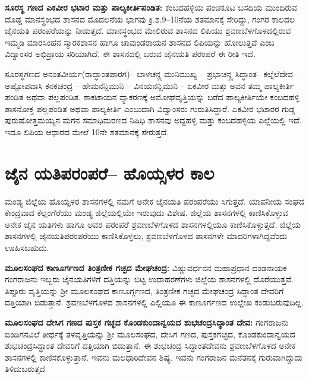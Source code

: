 \textbf{ಸೂರಸ್ಥ ಗಣದ ಎಕವೀರ ಭಟಾರ ಮತ್ತು ಪಾಲ್ಯಕೀರ್ತಿಪಂಡಿತ: } ಕಂಬದಹಳ್ಳಿಯ ಪಂಚಕೂಟ ಬಸದಿಯ ಮುಂದಿರುವ ದೊಡ್ಡ ಮಾನಸ್ಥಂಭದ ಶಾಸನದ ಮೊದಲನೆಯ ಭಾಗವು ಕ್ರಿ.ಶ.9–10ನೆಯ ಶತಮಾನಕ್ಕೆ ಸೇರಿದ್ದು, ಗಂಗರ ಕಾಲದಲ ಜೈನಯತಿ ಪರಂಪರೆಯನ್ನು ನೀಡುತ್ತದೆ. ಮಾನಸ್ಥಂಭದ ಮೇಲಿರುವ ಶಾಸನದ ಲಿಪಿಯು ಶ್ರವಣಬೆಳಗೊಳದಲ್ಲಿರುವ ಇಮ್ಮಡಿ ಮಾರಸಿಂಹನ ಸ್ಮಾರಕಶಾಸನ ಹಾಗೂ ಚಾವುಂಡರಾಯನ ಶಾಸನದ ಲಿಪಿಯನ್ನು ಹೋಲುತ್ತವೆ ಎಂಬ ವಿದ್ವಾಂಸರ ಅಭಿಪ್ರಾಯ ಸರಿಯಾಗಿದೆ. ಈ ಶಾಸನದಲ್ಲಿ ಬರುವ ಜೈನಯತಿ ಪರಂಪರೆ ಈ ರೀತಿ ಇದೆ.

ಸೂರಸ್ಥಗಣದ ಅನಂತವೀರ್ಯ(ರಾದ್ಧಾಂತಪಾರಗ)– ಬಾಳಚನ್ದ್ರ ಮುನಿಮುಖ್ಯ – ಪ್ರಭಾಚನ್ದ್ರ ಸಿದ್ಧಾಂತ– ಕಲ್ನೆಲೆದೇವ– ಅಷ್ಟೋಪವಾಸಿ ಕನಕಚಂದ್ರ – ಹೇಮನನ್ದಿಮುನಿ – ವಿನಯನನ್ದಿಮುನಿ – ಏಕವೀರ ಮತ್ತು ಅವನ ತಮ್ಮ ಪಾಲ್ಯಕೀರ್ತಿ ಪಂಡಿತ ಅಥವಾ ಪಲ್ಲಪಂಡಿತ. ಶಾಕಟಾಯನ ವ್ಯಾಕರಣಕ್ಕೆ ಅಮೋಘವೃತ್ತಿಯನ್ನು ಬರೆದ ಪಾಲ್ಯಕೀರ್ತಿಯೇ ಕಂಬದಹಳ್ಳಿ ಶಾಸನೋಕ್ತ ಪಲ್ಲಪಂಡಿತ ಅಥವಾ ಪಾಲ್ಯಕೀರ್ತಿ ಎಂಬುದಾಗಿ ವಿದ್ವಾಂಸರು ಗುರುತಿಸಿದ್ದಾರೆ. ಏಕವೀರ ಭಟಾರರ ಗುಡ್ಡ ಪುರುಷೋತ್ತಮಯ್ಯನ ಮಗನ ಸಮಾಧಿಮರಣದ ನಿಷಿಧಿ ಶಾಸನವು ಅದ್ದಹಳ್ಳಿ ಮತ್ತು ಕಂಬದಹಳ್ಳಿಯ ಎಲ್ಲೆಯಲ್ಲಿ ಇದೆ. ಇದೂ ಲಿಪಿಯ ಆಧಾರದ ಮೇಲೆ 10ನೇ ಶತಮಾನಕ್ಕೆ ಸೇರುತ್ತದೆ.


\section{ಜೈನ ಯತಿಪರಂಪರೆ– ಹೊಯ್ಸಳರ ಕಾಲ}

ಮಂಡ್ಯ ಜಿಲ್ಲೆಯ ಹೊಯ್ಸಳರ ಶಾಸನಗಳಲ್ಲಿ ನಮಗೆ ಅನೇಕ ಜೈನಯತಿ ಪರಂಪರೆಯು ಸಿಗುತ್ತದೆ. ಯಾಪನೀಯ ಸಂಘದ ಕೇಂದ್ರವಾದ ಕೆಲ್ಲಂಗೆರೆಯು ಮಂಡ್ಯ ಜಿಲ್ಲೆಯಲ್ಲಿಯೇ ಇರುವುದು ವಿಶೇಷ. ಜಿಲ್ಲೆಯ ಶಾಸನಗಳಲ್ಲಿ ಕಾಣಿಸಿಕೊಳ್ಳುವ ಅನೇಕ ಜೈನ ಯತಿಗಳು ಹಾಗೂ ಅವರ ಪರಂಪರೆ ಶ್ರವಣಬೆಳಗೊಳದ ಶಾಸನಗಳಲ್ಲಿಯೂ ಕಾಣಿಸಿಕೊಳ್ಳುತ್ತದೆ. ಜಿಲ್ಲೆಯ ಶಾಸನಗಳಲ್ಲಿ ಜೈನಯತಿಪರಂಪರೆಯು ಕಾಣಿಸಿಕೊಳ್ಳಲು, ಶ್ರವಣಬೆಳಗೊಳದ ಶಾಸನಗಳೇ ಮಾದರಿಗಳಾಗಿದ್ದವೆಂದು ಊಹಿಸಬಹುದು.

\textbf{ಮೂಲಸಂಘದ ಕಾಣೂರ್ಗಣದ ತಿಂತ್ರಣೀಕ ಗಚ್ಛದ ಮೇಘಚಂದ್ರ:} ವಿಷ್ಣುವರ್ಧನನ ಮಹಾಪ್ರಧಾನ ದಂಡನಾಯಕ ಗಂಗರಾಜನು ಇಬ್ಬರು ಜೈನಯತಿಗಳಿಗೆ ದತ್ತಿಯನ್ನು ಬಿಟ್ಟ ಉದಾಹರಣೆಗಳು ಜಿಲ್ಲೆಯ ಶಾಸನಗಳಲ್ಲಿ ದೊರೆಯುತ್ತವೆ. ತಿಪ್ಪೂರು ವೃತ್ತಿಯನ್ನು ಶ‍್ರೀ ಮೂಲಸಂಘದ ಕಾಣೂರ್ಗ್ಗಣದ, ತಿಂತ್ರಣೀಕ ಗಚ್ಛದ ಮೇಘಚಂದ್ರ ಸಿದ್ಧಾಂತ ದೇವರಿಗೆ ದತ್ತಿಯಾಗಿ ಬಿಡುತ್ತಾನೆ. ಶ್ರವಣಬೆಳಗೊಳದ ಶಾಸನಗಳಲ್ಲಿ ಎಲ್ಲಿಯೂ ಈ ಕಾಣೂರ್ಗಣದ ಉಲ್ಲೇಖ ಕಂಡುಬರುವುದಿಲ್ಲ.

\textbf{ಮೂಲಸಂಘದ ದೇಸಿಗ ಗಣದ ಪುಸ್ತಕ ಗಚ್ಛದ ಕೊಂಡಕುಂದಾನ್ವಯದ ಶುಭಚಂದ್ರಸಿದ್ಧಾಂತ ದೇವ:} ಗಂಗರಾಜನು ಬಿಂಡಿಗನವಿಲೆ ತೀರ್ಥಕ್ಕೆ ತಳವೃತ್ತಿಯನ್ನು ಶ‍್ರೀ ಮೂಲಸಂಘದ, ದೇಸಿಗ ಗಣದ, ಪುಸ್ತಕಗಚ್ಛದ, ಕೊಂಡಕುಂದಾನ್ವಯದ ಶುಭಚಂದ್ರಸಿದ್ಧಾಂತ ದೇವರಿಗೆ ದತ್ತಿಯಾಗಿ ಬಿಡುತ್ತಾನೆ. ಈ ಶುಭಚಂದ್ರ ಸಿದ್ಧಾಂತದೇವನು ಶ್ರವಣಬೆಳಗೊಳದ ಅನೇಕ ಶಾಸನಗಳಲ್ಲಿ ಕಾಣಿಸಕೊಳ್ಳುತ್ತಾನೆ. ಇವನು ಮಲಧಾರಿದೇವನ ಶಿಷ್ಯ. ಇವನು ಗಂಗರಾಜನ ಮನೆತನಕ್ಕೆ ಗುರುವಾಗಿದ್ದುದು ತಿಳಿದುಬರುತ್ತದೆ 

